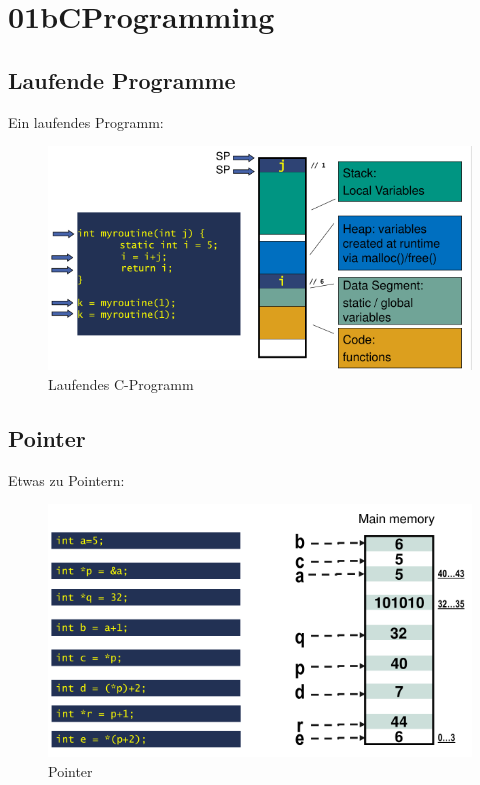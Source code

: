 \documentclass[a4paper]{scrreprt}
\begin{document}
\chapter{01bCProgramming}

\section{Laufende Programme}

Ein laufendes Programm:

\begin{figure}[ht]
\centering
\includegraphics[scale=0.6]{running_program.png}
\caption{Laufendes C-Programm}
\end{figure}

\section{Pointer}

Etwas zu Pointern:

\begin{figure}[ht]
\centering
\includegraphics[scale=0.6]{pointer.png}
\caption{Pointer}
\end{figure}
\end{document}
